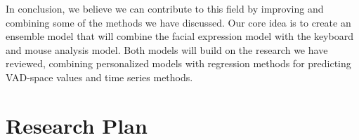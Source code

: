 \documentclass{article}
\begin{document}
In conclusion, we believe we can contribute to this field by improving and combining some of the 
methods we have discussed. Our core idea is to create an ensemble model that will combine the 
facial expression model with the keyboard and mouse analysis model. 
Both models will build on the research we have reviewed, combining personalized models with 
regression methods for predicting VAD-space values and time series methods.


\section{Research Plan}


\newpage


%  

\end{document}
